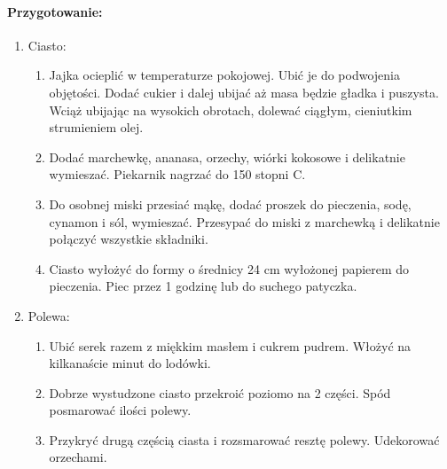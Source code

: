 \documentclass{article}
\begin{document}
    \paragraph{Przygotowanie:}
    \begin{enumerate}
        \item Ciasto:
            \begin{enumerate}
                \item Jajka ocieplić w temperaturze pokojowej. Ubić je do
                    podwojenia objętości. Dodać cukier i dalej ubijać aż masa
                    będzie gładka i puszysta. Wciąż ubijając na wysokich
                    obrotach, dolewać ciągłym, cieniutkim strumieniem olej.
                \item Dodać marchewkę, ananasa, orzechy, wiórki kokosowe i
                    delikatnie wymieszać. Piekarnik nagrzać do 150 stopni C.
                \item Do osobnej miski przesiać mąkę, dodać proszek do
                    pieczenia, sodę, cynamon i sól, wymieszać. Przesypać do
                    miski z marchewką i delikatnie połączyć wszystkie składniki.
                \item Ciasto wyłożyć do formy o średnicy 24 cm wyłożonej
                    papierem do pieczenia. Piec przez 1 godzinę lub do suchego
                    patyczka.
            \end{enumerate}
        \item Polewa:
            \begin{enumerate}
                \item Ubić serek razem z miękkim masłem i cukrem pudrem. Włożyć na kilkanaście minut do lodówki.
                \item Dobrze wystudzone ciasto przekroić poziomo na 2 części.
                    Spód posmarować  ilości polewy.
                \item Przykryć drugą częścią ciasta i rozsmarować resztę polewy. Udekorować orzechami.
            \end{enumerate}
    \end{enumerate}
    \newpage

%
\end{document}
